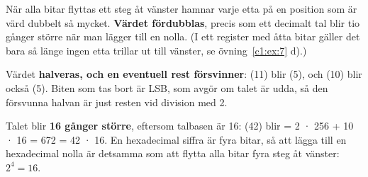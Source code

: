 När alla bitar flyttas ett steg åt vänster hamnar varje etta på en position som är värd
dubbelt så mycket. \textbf{Värdet fördubblas}, precis som ett decimalt tal blir tio gånger större
när man lägger till en nolla. (I ett register med åtta bitar gäller det bara så länge ingen etta
trillar ut till vänster, se övning~\ref{c1:ex:7} d).)

Värdet \textbf{halveras, och en eventuell rest försvinner}:  (11) blir
 (5), och  (10) blir också  (5). Biten som tas bort är LSB, som
avgör om talet är udda, så den försvunna halvan är just resten vid division med 2.

Talet blir \textbf{16 gånger större}, eftersom talbasen är 16:  (42) blir
 = 2 · 256 + 10 · 16 = 672 = 42 · 16. En hexadecimal siffra är fyra bitar, så att lägga
till en hexadecimal nolla är detsamma som att flytta alla bitar fyra steg åt vänster: $2^4 = 16$.
